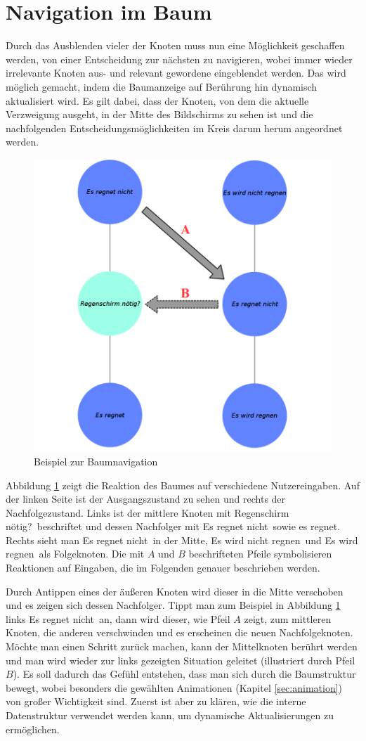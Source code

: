 \section{Navigation im Baum}
Durch das Ausblenden vieler der Knoten muss nun eine Möglichkeit geschaffen werden, von einer Entscheidung zur nächsten zu navigieren, wobei immer wieder irrelevante Knoten aus- und relevant gewordene eingeblendet werden. Das wird möglich gemacht, indem die Baumanzeige auf Berührung hin dynamisch aktualisiert wird. Es gilt dabei, dass der Knoten, von dem die aktuelle Verzweigung ausgeht, in der Mitte des Bildschirms zu sehen ist und die nachfolgenden Entscheidungsmöglichkeiten im Kreis darum herum angeordnet werden.
\begin{figure}
	\centering
	\includegraphics[width=.7\linewidth]{../screenshots/baumnavigation.PNG}
	\caption{Beispiel zur Baumnavigation}
	\label{abb:baumnavigation}
\end{figure}
Abbildung \ref{abb:baumnavigation} zeigt die Reaktion des Baumes auf verschiedene Nutzereingaben. Auf der linken Seite ist der Ausgangszustand zu sehen und rechts der Nachfolgezustand. Links ist der mittlere Knoten mit \glqq Regenschirm nötig?\grqq\ beschriftet und dessen Nachfolger mit \glqq Es regnet nicht\grqq\ sowie \glqq es regnet\grqq. Rechts sieht man \glqq Es regnet nicht\grqq\ in der Mitte, \glqq Es wird nicht regnen\grqq\ und \glqq Es wird regnen\grqq\ als Folgeknoten. Die mit $A$ und $B$ beschrifteten Pfeile symbolisieren Reaktionen auf Eingaben, die im Folgenden genauer beschrieben werden. 

Durch Antippen eines der äußeren Knoten wird dieser in die Mitte verschoben und es zeigen sich dessen Nachfolger. Tippt man zum Beispiel in Abbildung \ref{abb:baumnavigation} links \glqq Es regnet nicht\grqq\ an, dann wird dieser, wie Pfeil $A$ zeigt, zum mittleren Knoten, die anderen verschwinden und es erscheinen die neuen Nachfolgeknoten. Möchte man einen Schritt zurück machen, kann der Mittelknoten berührt werden und man wird wieder zur links gezeigten Situation geleitet (illustriert durch Pfeil $B$). Es soll dadurch das Gefühl entstehen, dass man sich durch die Baumstruktur bewegt, wobei besonders die gewählten Animationen (Kapitel \ref{sec:animation}) von großer Wichtigkeit sind. Zuerst ist aber zu klären, wie die interne Datenstruktur verwendet werden kann, um dynamische Aktualisierungen zu ermöglichen.
  
